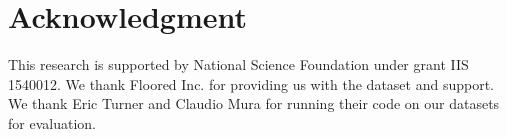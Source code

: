 \documentclass[10pt,twocolumn,letterpaper]{article}
\newcommand{\yasu}[1]{}
\begin{document}
\begin{abstract}
 
\end{abstract}

  

%



\section*{Acknowledgment}
This research is supported by National Science Foundation under grant IIS 1540012. We thank Floored Inc. for providing us with the dataset and support. We thank Eric Turner and Claudio Mura for running their code on our datasets for evaluation.
\clearpage
{\small
	
	
}

	
\end{document}
